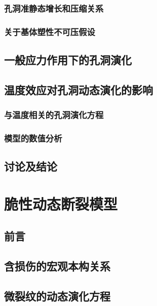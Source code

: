 \documentclass[degree=postdoc]{sysuthesis}
\begin{document}
\clearpage
\setcounter{page}{93}
\subsection{孔洞准静态增长和压缩关系}

\clearpage
\setcounter{page}{94}
\subsection{关于基体塑性不可压假设}

\clearpage
\setcounter{page}{96}
\section{一般应力作用下的孔洞演化}

\clearpage
\setcounter{page}{98}
\section{温度效应对孔洞动态演化的影响}
\subsection{与温度相关的孔洞演化方程}

\clearpage
\setcounter{page}{100}
\subsection{模型的数值分析}

\clearpage
\setcounter{page}{102}
\section{讨论及结论}

\clearpage
\setcounter{page}{116}
\chapter{脆性动态断裂模型}
\section{前言}

\clearpage
\setcounter{page}{117}
\section{含损伤的宏观本构关系}

\clearpage
\setcounter{page}{121}
\section{微裂纹的动态演化方程}
\end{document}
